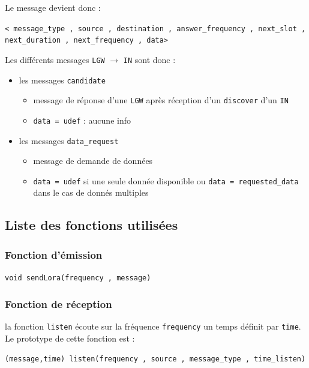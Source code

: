 \documentclass[11pt]{article}
\begin{document}
Le message devient donc :

\begin{center}
\texttt{< message\_type , source , destination , answer\_frequency , next\_slot , next\_duration , next\_frequency , data>}
\end{center}

Les différents messages \texttt{LGW} $\rightarrow$ \texttt{IN} sont donc :
\begin{itemize}
    \item les messages \texttt{candidate} %
    \begin{itemize}
      \item message de réponse d'une \texttt{LGW} après réception d'un \texttt{discover} d'un \texttt{IN}
      \item \texttt{data = udef} : aucune info
    \end{itemize}
    \item les messages \texttt{data\_request}
    \begin{itemize}
      \item message de demande de données
      \item \texttt{data = udef} si une seule donnée disponible ou \texttt{data = requested\_data} dans le cas de donnés multiples
    \end{itemize}
\end{itemize}

\subsection{Liste des fonctions utilisées}

\subsubsection{Fonction d'émission}

\texttt{void sendLora(frequency , message)}

\subsubsection{Fonction de réception}

la fonction \texttt{listen} écoute sur la fréquence \texttt{frequency} un temps définit par \texttt{time}. Le prototype de cette fonction est :

\begin{center}
\texttt{(message,time) listen(frequency , source , message\_type , time\_listen)}
\end{center}
\end{document}
